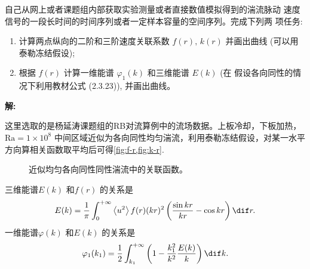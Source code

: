 \documentclass[12pt,a4]{ctexart}
\begin{document}
自己从网上或者课题组内部获取实验测量或者直接数值模拟得到的湍流脉动 速度信号的一段长时间的时间序列或者一定样本容量的空间序列。完成下列两 项任务:
\begin{enumerate}
   \item 计算两点纵向的二阶和三阶速度关联系数 $f(r),\, k(r)$ 并画出曲线 (可以用泰勒冻结假设);
   \item 根据 $f(r)$ 计算一维能谱 $\varphi_{1}(k)$ 和三维能谱 $E(k)$ (在 假设各向同性的情况下利用教材公式 (2.3.23)), 并画出曲线。
\end{enumerate}

\textsf{\hspace{-2em}\sf  \textbf{解:}}

这里选取的是杨延涛课题组的RB对流算例中的流场数据。上板冷却，下板加热， $\mathrm{Ra} = 1 \times 10^{8}$ 中间区域近似为各向同性均匀湍流，利用泰勒冻结假设，对某一水平方向算相关函数取平均后可得\cref{fig:f-r,fig:k-r}.
\begin{figure}%
   \centering
   \quad
   \caption{近似均匀各向同性同性湍流中的关联函数。}
\end{figure}
三维能谱$E(k)$ 和$f(r)$ 的关系是
\begin{equation}
   E(k) = \frac{1}{\pi} \int_{0}^{+\infty} \left< u^2 \right> f(r) (kr)^{2} \left( \frac{\sin kr}{kr} - \cos kr \right) \dif r.
\end{equation}
一维能谱$\varphi(k)$ 和$E(k)$ 的关系是
\begin{equation}
   \varphi_1(k_1) = \frac{1}{2} \int_{k_1}^{+\infty} \left( 1 - \frac{k_1^2}{k^2} \frac{E(k)}{k}\right) \dif k. 
\end{equation}
\end{document}
